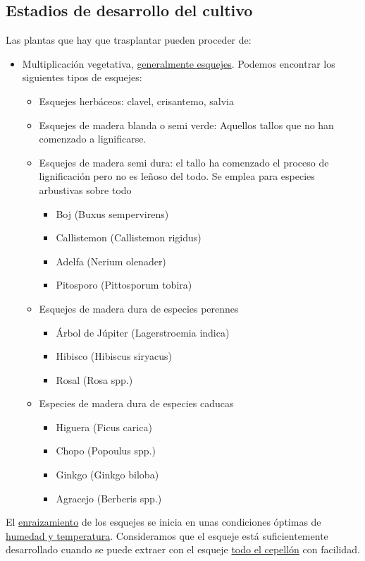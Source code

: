 \documentclass[a4paper,12pt,oneside]{article}
\begin{document}
\subsection{Estadios de desarrollo del cultivo}
\label{sec:org185320b}
Las plantas que hay que trasplantar pueden proceder de:
\begin{itemize}
\item Multiplicación vegetativa, \uline{generalmente esquejes}. Podemos encontrar los
siguientes tipos de esquejes:
\begin{itemize}
\item Esquejes herbáceos: clavel, crisantemo, salvia
\item Esquejes de madera blanda o semi verde: Aquellos tallos que no han comenzado
a lignificarse.
\item Esquejes de madera semi dura: el tallo ha comenzado el proceso de
lignificación pero no es leñoso del todo. Se emplea para especies arbustivas
sobre todo
\begin{itemize}
\item Boj (Buxus sempervirens)
\item Callistemon (Callistemon rigidus)
\item Adelfa (Nerium olenader)
\item Pitosporo (Pittosporum tobira)
\end{itemize}
\item Esquejes de madera dura de especies perennes
\begin{itemize}
\item Árbol de Júpiter (Lagerstroemia indica)
\item Hibisco (Hibiscus siryacus)
\item Rosal (Rosa spp.)
\end{itemize}
\item Especies de madera dura de especies caducas
\begin{itemize}
\item Higuera (Ficus carica)
\item Chopo (Popoulus spp.)
\item Ginkgo (Ginkgo biloba)
\item Agracejo (Berberis spp.)
\end{itemize}
\end{itemize}
\end{itemize}

El \uline{enraizamiento} de los esquejes se inicia en unas condiciones óptimas de
\uline{humedad y temperatura}. Consideramos que el esqueje está suficientemente desarrollado
cuando se puede extraer con el esqueje \uline{todo el cepellón} con facilidad.
\end{document}
